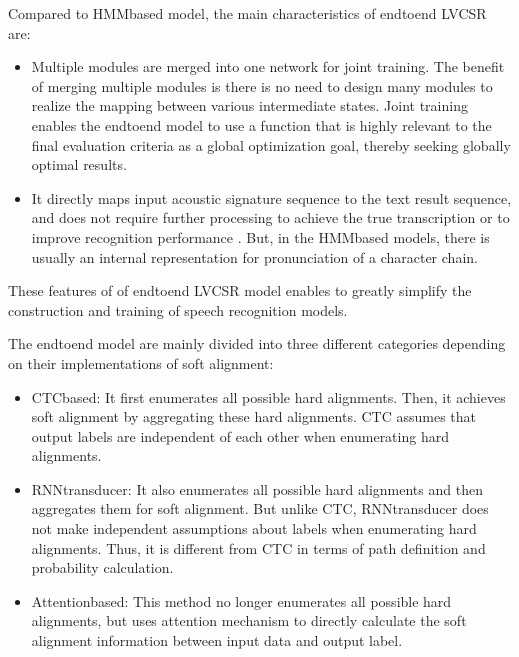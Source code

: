 \documentclass[letterpaper,10pt,english]{jupyterBook}
\begin{document}
\sphinxAtStartPar
Compared to HMM\sphinxhyphen{}based model, the main characteristics of end\sphinxhyphen{}to\sphinxhyphen{}end
LVCSR are:
\begin{itemize}
\item {} 
\sphinxAtStartPar
Multiple modules are merged into one network for joint training. The
benefit of merging multiple modules is there is no need to design
many modules to realize the mapping between various intermediate
states. Joint training enables the end\sphinxhyphen{}to\sphinxhyphen{}end model to use a
function that is highly relevant to the final evaluation criteria as
a global optimization goal, thereby seeking globally optimal
results.

\item {} 
\sphinxAtStartPar
It directly maps input acoustic signature sequence to the text
result sequence, and does not require further processing to achieve
the true transcription or to improve recognition performance . But,
in the HMM\sphinxhyphen{}based models, there is usually an internal representation
for pronunciation of a character chain.

\end{itemize}

\sphinxAtStartPar
These features of of end\sphinxhyphen{}to\sphinxhyphen{}end LVCSR model enables to greatly simplify
the construction and training of speech recognition models.

\sphinxAtStartPar
The end\sphinxhyphen{}to\sphinxhyphen{}end model are mainly divided into three different categories
depending on their implementations of soft alignment:
\begin{itemize}
\item {} 
\sphinxAtStartPar
CTC\sphinxhyphen{}based: It first enumerates all possible hard alignments. Then,
it achieves soft alignment by aggregating these hard alignments. CTC
assumes that output labels are independent of each other when
enumerating hard alignments.

\item {} 
\sphinxAtStartPar
RNN\sphinxhyphen{}transducer: It also enumerates all possible hard alignments and
then aggregates them for soft alignment. But unlike CTC,
RNN\sphinxhyphen{}transducer does not make independent assumptions about labels
when enumerating hard alignments. Thus, it is different from CTC in
terms of path definition and probability calculation.

\item {} 
\sphinxAtStartPar
Attention\sphinxhyphen{}based: This method no longer enumerates all possible hard
alignments, but uses attention mechanism to directly calculate the
soft alignment information between input data and output label.

\end{itemize}
\end{document}
